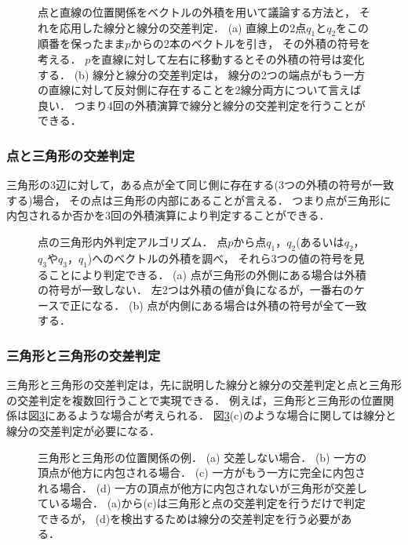 \begin{figure}
\centering

\caption{
    点と直線の位置関係をベクトルの外積を用いて議論する方法と，
    それを応用した線分と線分の交差判定．
    (a) 直線上の2点$q_1$と$q_2$をこの順番を保ったまま$p$からの2本のベクトルを引き，
        その外積の符号を考える．
        $p$を直線に対して左右に移動するとその外積の符号は変化する．
    (b) 線分と線分の交差判定は，
        線分の2つの端点がもう一方の直線に対して反対側に存在することを2線分両方について言えば良い．
        つまり4回の外積演算で線分と線分の交差判定を行うことができる．
}
\label{fig:segment_segment}
\end{figure}

\subsubsection{点と三角形の交差判定}
三角形の3辺に対して，ある点が全て同じ側に存在する(3つの外積の符号が一致する)場合，
その点は三角形の内部にあることが言える．
つまり点が三角形に内包されるか否かを3回の外積演算により判定することができる．

\begin{figure}
\centering

\caption{
    点の三角形内外判定アルゴリズム．
    点$p$から点$q_1$，$q_2$(あるいは$q_2$，$q_3$や$q_3$，$q_1$)へのベクトルの外積を調べ，
    それら3つの値の符号を見ることにより判定できる．
    (a) 点が三角形の外側にある場合は外積の符号が一致しない．
        左2つは外積の値が負になるが，一番右のケースで正になる．
    (b) 点が内側にある場合は外積の符号が全て一致する．
}
\label{fig:point_triangle}
\end{figure}

\subsubsection{三角形と三角形の交差判定}
三角形と三角形の交差判定は，先に説明した線分と線分の交差判定と点と三角形の交差判定を複数回行うことで実現できる．
例えば，三角形と三角形の位置関係は図\ref{fig:triangle_triangle}にあるような場合が考えられる．
図\ref{fig:triangle_triangle}(c)のような場合に関しては線分と線分の交差判定が必要になる．

\begin{figure}
\centering

\caption{
    三角形と三角形の位置関係の例．
    (a) 交差しない場合．
    (b) 一方の頂点が他方に内包される場合．
    (c) 一方がもう一方に完全に内包される場合．
    (d) 一方の頂点が他方に内包されないが三角形が交差している場合．
        (a)から(c)は三角形と点の交差判定を行うだけで判定できるが，
        (d)を検出するためは線分の交差判定を行う必要がある．
}
\label{fig:triangle_triangle}
\end{figure}

